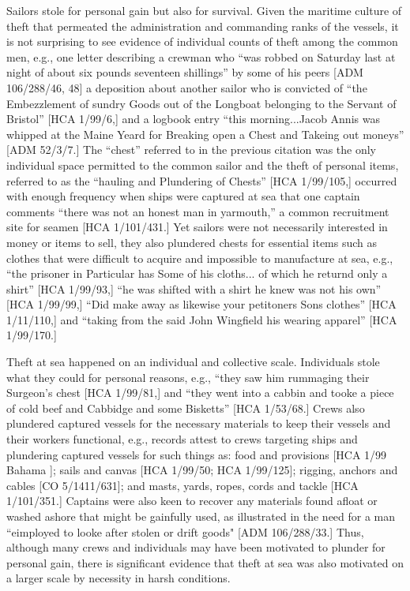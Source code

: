   Sailors stole for personal gain but also for survival. Given the maritime culture of theft that permeated the administration and commanding ranks of the vessels, it is not surprising to see evidence of individual counts of theft among the common men, e.g., one letter describing a crewman who “was robbed on Saturday last at night of about six pounds seventeen shillings” by some of his peers [ADM 106/288/46, 48] a deposition about another sailor who is convicted of “the Embezzlement of sundry Goods out of the Longboat belonging to the Servant of Bristol” [HCA 1/99/6,] and a logbook entry “this morning...Jacob Annis was whipped at the Maine Yeard for Breaking open a Chest and Takeing out moneys” [ADM 52/3/7.] The “chest” referred to in the previous citation was the only individual space permitted to the common sailor and the theft of personal items, referred to as the “hauling and Plundering of Chests” [HCA 1/99/105,] occurred with enough frequency when ships were captured at sea that one captain comments “there was not an honest man in yarmouth,” a common recruitment site for seamen [HCA 1/101/431.] Yet sailors were not necessarily interested in money or items to sell, they also plundered chests for essential items such as clothes that were difficult to acquire and impossible to manufacture at sea, e.g., “the prisoner in Particular has Some of his cloths... of which he returnd only a shirt” [HCA 1/99/93,] “he was shifted with a shirt he knew was not his own” [HCA 1/99/99,] “Did make away as likewise your petitoners Sons clothes” [HCA 1/11/110,] and “taking from the said John Wingfield his wearing apparel” [HCA 1/99/170.] 

  Theft at sea happened on an individual and collective scale. Individuals stole what they could for personal reasons, e.g., “they saw him rummaging their Surgeon’s chest [HCA 1/99/81,] and “they went into a cabbin and tooke a piece of cold beef and Cabbidge and some Bisketts” [HCA 1/53/68.] Crews also plundered captured vessels for the necessary materials to keep their vessels and their workers functional, e.g., records attest to crews targeting ships and plundering captured vessels for such things as: food and provisions [HCA 1/99 Bahama \citealt{Islands1722}]; sails and canvas [HCA 1/99/50; HCA 1/99/125]; rigging, anchors and cables [CO 5/1411/631]; and masts, yards, ropes, cords and tackle [HCA 1/101/351.] Captains were also keen to recover any materials found afloat or washed ashore that might be gainfully used, as illustrated in the need for a man “eimployed to looke after stolen or drift goods" [ADM 106/288/33.] Thus, although many crews and individuals may have been motivated to plunder for personal gain, there is significant evidence that theft at sea was also motivated on a larger scale by necessity in harsh conditions. 

